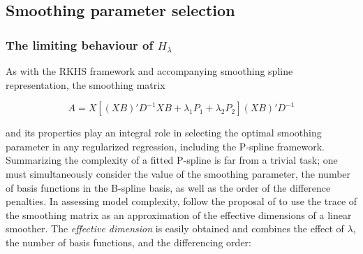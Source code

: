 

\subsection{Smoothing parameter selection}

%
\subsubsection{The limiting behaviour of $H_\lambda$}

As with the RKHS framework and accompanying smoothing spline representation, the smoothing matrix  

\[
A = X \left[ \left(XB\right)' D^{-1} XB +  \lambda_1 P_1+ \lambda_2 P_2\right] \left(X B\right)' D^{-1}
\]

\noindent
and its properties play an integral role in selecting the optimal smoothing parameter in any regularized regression, including the P-spline framework.  Summarizing the complexity of a fitted P-spline is far from a trivial task; one must simultaneously consider the value of the smoothing parameter, the number of basis functions in the B-spline basis, as well as the order of the difference penalties. In assessing model complexity, \cite{eilers1996flexible} follow the proposal of \cite{hastie1990generalized} to use the trace of the smoothing matrix as an approximation of the effective dimensions of a linear smoother. The \emph{effective dimension} is easily obtained and combines the effect of $\lambda$, the number of basis functions, and the differencing order: 


